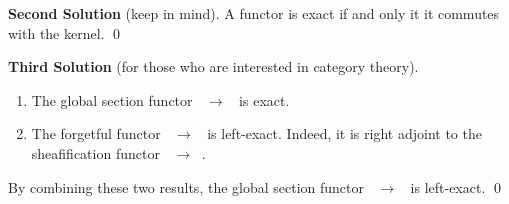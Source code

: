 \documentclass{article}
\theoremstyle{plain}
\theoremstyle{definition}
\DeclareMathOperator{\Ab}{\underline{\textsf{Ab}}}
\DeclareMathOperator{\PSh}{\underline{\textsf{PSh}}}
\DeclareMathOperator{\Sh}{\underline{\textsf{Sh}}}
\begin{document}
\begin{tcolorbox}
    \textbf{Second Solution} (keep in mind). A functor is exact if and only it it commutes with the kernel. \qed
\end{tcolorbox}

\begin{tcolorbox}
    \textbf{Third Solution} (for those who are interested in category theory).

    \begin{enumerate}[label=\fbox{\arabic*}]
        \item The global section functor $\PSh \to \Ab$ is exact.
        \item The forgetful functor $\Sh \to \PSh$ is left-exact. Indeed, it is right adjoint to the sheafification functor $\PSh \to \Sh$.
    \end{enumerate}

    By combining these two results, the global section functor $\Sh \to \Ab$ is left-exact. \qed
\end{tcolorbox}
\end{document}
